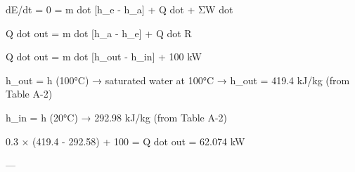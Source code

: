dE/dt = 0 = m dot [h_e - h_a] + Q dot + ΣW dot  

Q dot out = m dot [h_a - h_e] + Q dot R  

Q dot out = m dot [h_out - h_in] + 100 kW  

h_out = h (100°C) → saturated water at 100°C  
→ h_out = 419.4 kJ/kg (from Table A-2)  

h_in = h (20°C) → 292.98 kJ/kg (from Table A-2)  

0.3 × (419.4 - 292.58) + 100 = Q dot out = 62.074 kW  

---